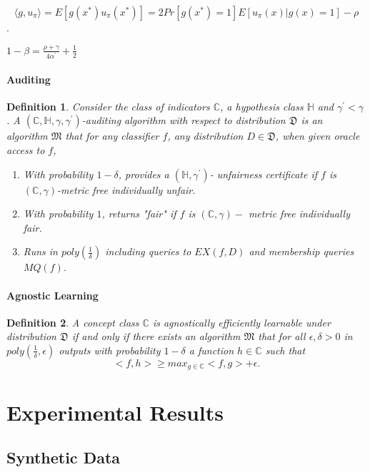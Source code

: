 \documentclass{article}
\newtheorem{defn}{Definition}[section]
\begin{document}
$$ \langle g, u_{\pi} \rangle= E[g(x^{*})u_{\pi}(x^{*})] = 2Pr[g(x^{*})=1]E[u_{\pi}(x)|g(x)=1] - \rho$$.

$1-\beta=\frac{\rho + \gamma}{4\alpha^{'}}+ \frac{1}{2}$
\paragraph{Auditing}

\begin{defn}
Consider the class of indicators $\mathbb{C}$, a hypothesis class $\mathbb{H}$ and $\gamma^{'} < \gamma$. A $(\mathbb{C}, \mathbb{H}, \gamma, \gamma^{'})$-auditing algorithm with respect to distribution $\mathfrak{D}$ is an algorithm $\mathfrak{M}$ that for any classifier $f$, any distribution $D\in \mathfrak{D}$, when given oracle access to $f$, 
\begin{enumerate}
    \item With probability $1-\delta$, provides a $(\mathbb{H}, \gamma^{'})$- unfairness certificate if $f$ is $(\mathbb{C}, \gamma)$-metric free individually unfair.
    \item With probability $1$, returns "fair" if $f$ is $(\mathbb{C}, \gamma)-$ metric free individually fair.
    \item Runs in $poly(\frac{1}{\delta})$ including queries to $EX(f, D)$ and membership queries $MQ(f)$.
\end{enumerate} 
\end{defn}

\paragraph{Agnostic Learning}
\begin{defn}
A concept class $\mathbb{C}$ is agnostically efficiently learnable under distribution $\mathfrak{D}$ if and only if there exists an algorithm $\mathfrak{M}$ that for all $\epsilon, \delta >0$ in $poly(\frac{1}{\delta}, \epsilon)$ outputs with probability $1-\delta$ a function $h\in \mathbb{C}$ such that
$$ <f,h> \geq max_{g\in \mathbb{C}}<f, g> + \epsilon. $$
\end{defn}

 
\section{Experimental Results}
\subsection{Synthetic Data}
\end{document}
